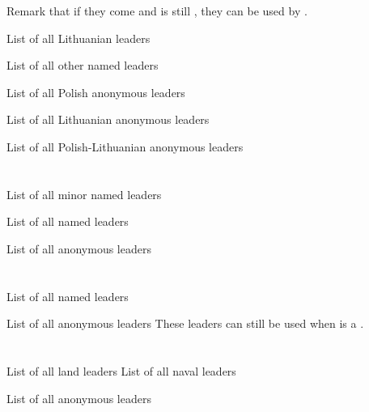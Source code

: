 \bparag Remark that if they come and \paysPologne is still \MAJ, they can be
used by \POL.

\aparag List of all Lithuanian leaders 

\aparag List of all other named leaders 

\aparag List of all Polish anonymous leaders \listanonymepologne

\aparag List of all Lithuanian anonymous leaders \listanonymelithuanie

\aparag List of all Polish-Lithuanian anonymous leaders \listanonymepollit




\section{\paysmajeurPrusse}

\aparag List of all minor named leaders 

\aparag List of all named leaders 

\aparag List of all anonymous leaders \listanonymeprusseM




\section{\paysmajeurPortugal}

\aparag List of all named leaders 

\aparag List of all anonymous leaders
\bparag These leaders can still be used when \paysPortugal is a \MIN.
\listanonymeportugal




\section{\paysmajeurRussie}

\aparag List of all land leaders 
\aparag List of all naval leaders 

\aparag List of all anonymous leaders \listanonymerussie




\section{\paysmajeurSuede}

